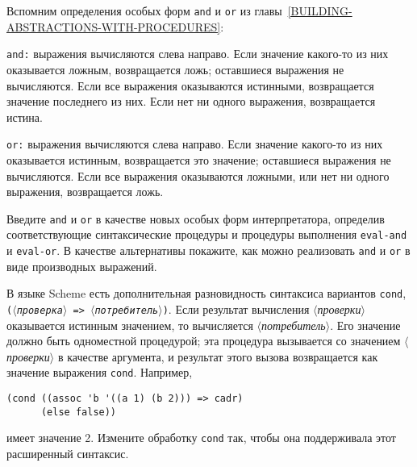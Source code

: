\begin{exercise}{4.4}%
\label{EX4.4}%
Вспомним определения 
особых форм {\tt and} и {\tt or} из
главы~\ref{BUILDING-ABSTRACTIONS-WITH-PROCEDURES}:

\begin{plainlist}
\item
{\tt and:} выражения вычисляются слева
направо.  
Если значение какого-то из них оказывается ложным,
возвращается ложь; оставшиеся выражения не вычисляются.  Если все
выражения оказываются истинными, возвращается значение последнего из
них.  Если нет ни одного выражения, возвращается истина.

\item
{\tt or:} выражения вычисляются слева
направо.  
Если значение какого-то из них оказывается истинным, возвращается это 
значение; оставшиеся выражения не вычисляются.  Если 
все выражения оказываются ложными, или нет ни одного выражения,
возвращается ложь.
\end{plainlist}
Введите {\tt and} и {\tt or} в качестве новых особых
форм интерпретатора, определив соответствующие синтаксические
процедуры и процедуры выполнения {\tt eval-and} и
{\tt eval-or}. В качестве альтернативы покажите, как можно
реализовать {\tt and} и {\tt or} в виде производных
выражений.
\end{exercise}

\begin{exercise}{4.5}\label{EX4.5}%
\sloppy
{}%
%
%
В языке Scheme есть дополнительная 
разновидность синтаксиса
вариантов {\tt cond}, {\tt (\textit{$\langle$про\-вер\-ка$\rangle$}~=>~\textit{$\langle$потребитель$\rangle$})}.  Если результат вычисления
\textit{$\langle$проверки$\rangle$} оказывается истинным значением, то
вычисляется \textit{$\langle$потребитель$\rangle$}.  Его значение должно быть
одноместной процедурой; эта процедура вызывается со значением
\textit{$\langle$проверки$\rangle$} в качестве аргумента, и результат этого
вызова возвращается как значение выражения
{\tt cond}. Например,
\sloppy

\begin{Verbatim}[fontsize=\small]
(cond ((assoc 'b '((a 1) (b 2))) => cadr)
      (else false))
\end{Verbatim}
имеет значение 2.  Измените обработку {\tt cond} так, чтобы она
поддерживала этот расширенный синтаксис.
\end{exercise}

